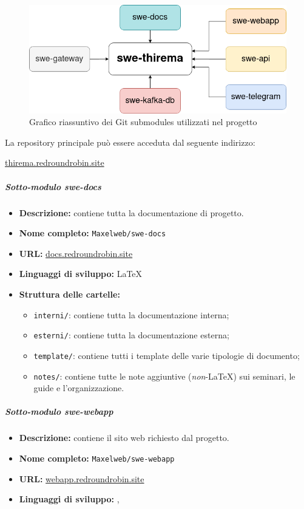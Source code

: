 		\begin{figure}[H]
			\centering
			\includegraphics[scale=0.7]{res/images/submodules}
			\caption{Grafico riassuntivo dei Git submodules utilizzati nel progetto}
		\end{figure}
		
		La repository principale può essere acceduta dal seguente indirizzo:

		\href{https://github.com/Maxelweb/swe-thirema}{thirema.redroundrobin.site}

		\subparagraph{Sotto-modulo swe-docs}

		\begin{itemize}
		 	\item \textbf{Descrizione:} contiene tutta la documentazione di progetto.
		 	\item \textbf{Nome completo:} \verb!Maxelweb/swe-docs!
		 	\item \textbf{URL:} \href{https://github.com/Maxelweb/swe-docs}{docs.redroundrobin.site}
		 	\item \textbf{Linguaggi di sviluppo:} \LaTeX{}
		 	\item \textbf{Struttura delle cartelle:}
			\begin{itemize}
				\item \verb!interni/!: contiene tutta la documentazione interna;
				\item \verb!esterni/!: contiene tutta la documentazione esterna;
				\item \verb!template/!: contiene tutti i template delle varie tipologie di documento;
				\item \verb!notes/!: contiene tutte le note aggiuntive (\textit{non}-\LaTeX{}) sui seminari, le guide e l'organizzazione.
			\end{itemize}
		 \end{itemize}

		\subparagraph{Sotto-modulo swe-webapp}

		\begin{itemize}
		 	\item \textbf{Descrizione:} contiene il sito web richiesto dal progetto.
		 	\item \textbf{Nome completo:} \verb!Maxelweb/swe-webapp!
		 	\item \textbf{URL:} \href{https://github.com/Maxelweb/swe-webapp}{webapp.redroundrobin.site}
		 	\item \textbf{Linguaggi di sviluppo:} , 
		 \end{itemize}

